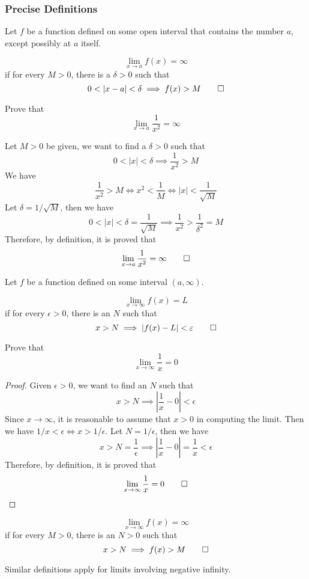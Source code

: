 \subsubsection{Precise Definitions}
Let \(f\) be a function defined on some open interval that contains the number
\(a\), except possibly at \(a\) itself.
\begin{definition}
    \[\lim_{x\to a}f(x)=\infty\] if for every \(M>0\), there is a
    \(\delta>0\) such that \[0<|x-a|<\delta\implies f(x)>M\qedhere\]
\end{definition}
\begin{problem}
    Prove that \[\lim_{x\to a}\frac{1}{x^2}=\infty\]
\end{problem}
\begin{solution}
    Let \(M>0\) be given, we want to find a \(\delta>0\) such that
    \[0<|x|<\delta\implies\frac{1}{x^2}>M\]
    We have
    \[\frac{1}{x^2}>M\iff x^2<\frac{1}{M}\iff|x|<\frac{1}{\sqrt{M}}\]
    Let \(\delta=1/\sqrt{M}\), then we have
    \[0<|x|<\delta=\frac{1}{\sqrt{M}}\implies\frac{1}{x^2}>\frac{1}{\delta^2}=M\]
    Therefore, by definition, it is proved that
    \[\lim_{x\to a}\frac{1}{x^2}=\infty\qedhere\]
\end{solution}
Let \(f\) be a function defined on some interval \((a,\infty)\).
\begin{definition}
    \[\lim_{x\to \infty}f(x)=L\] if for every \(\epsilon>0\), there is an \(N\)
    such that \[x>N\implies|f(x)-L|<\epsilon\qedhere\]
\end{definition}
\begin{problem}
    Prove that \[\lim_{x\to \infty}\frac{1}{x}=0\]
\end{problem}
\begin{proof}
    Given \(\epsilon>0\), we want to find an \(N\) such that
    \[x>N\implies\left|\frac{1}{x}-0\right|<\epsilon\]
    Since \(x\to \infty\), it is reasonable to assume that \(x>0\) in
    computing the limit.
    Then we have \(1/x<\epsilon\iff x>1/\epsilon\).
    Let \(N=1/\epsilon\), then we have
    \[x>N=\frac{1}{\epsilon}\implies\left|\frac{1}{x}-0\right|=\frac{1}{x}
    <\epsilon\]
    Therefore, by definition, it is proved that
    \[\lim_{x\to \infty}\frac{1}{x}=0\qedhere\]
\end{proof}
\begin{definition}
    \[\lim_{x\to \infty}f(x)=\infty\] if for every \(M>0\), there is an \(N>0\)
    such that \[x>N\implies f(x)>M\qedhere\]
\end{definition}
Similar definitions apply for limits involving negative infinity.